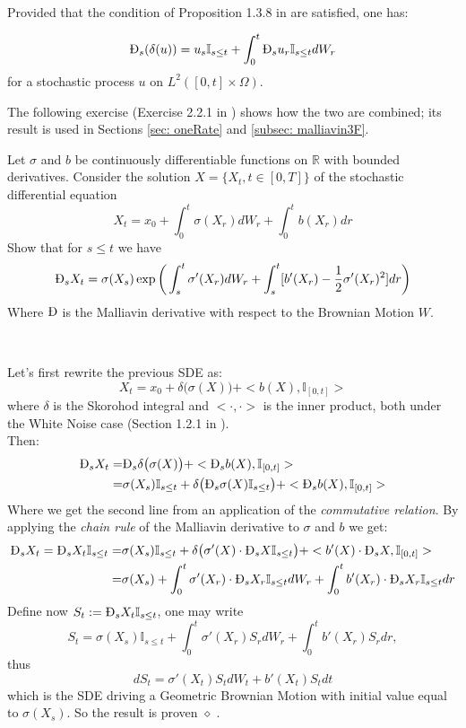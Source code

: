 \begin{prop}\ \\
Provided that the condition of Proposition 1.3.8 in \cite{nualart} are satisfied, one has:

\begin{equation}\label{eq: commumativeRelation}
\MD_s( \delta(u) )= u_s\mathbb{I}_{s\leq t} + \int_0^t\MD_s u_r \mathbb{I}_{s\leq t}dW_r
\end{equation}
for a stochastic process $u$ on $L^2([0,t] \times \Omega)$.
\end{prop}

The following exercise (Exercise 2.2.1 in \cite{nualart}) shows how the two are combined; its result is used in Sections \ref{sec: oneRate} and \ref{subsec: malliavin3F}.\\

\begin{exe}
Let $\sigma$ and $b$ be continuously differentiable functions on $\mathbb{R}$ with bounded
derivatives. Consider the solution $X = \{X_t, t \in [0, T]\}$ of the stochastic
differential equation
$$ X_t = x_0 + \int_0^t\sigma(X_r)dW_r + \int_0^tb(X_r)dr$$
Show that for $s\leq t$ we have
$$ \MD_sX_t = \sigma(X_s)\exp\bigg(\int_s^t\sigma'(X_r)dW_r  + \int_s^t[b'(X_r)-\frac{1}{2}\sigma'(X_r)^2]dr  \bigg) $$
Where $\MD$ is the Malliavin derivative with respect to the Brownian Motion $W$.
\end{exe}\
\\
\begin{sol}
Let's first rewrite the previous SDE as:
$$ X_t = x_0 + \delta\big(\sigma(X)\big) + <b(X),\mathbb{I}_{[0,t]}> $$
where $\delta$ is the Skorohod integral and $<\cdot, \cdot>$ is the inner product, both under the White Noise case (Section 1.2.1 in \cite{nualart}).\\
Then:
\begin{align*}
\MD_sX_t = & \MD_s\delta\big(\sigma(X)\big) + <\MD_sb(X),\mathbb{I}_{[0,t]}>\\
= & \sigma(X_s)\mathbb{I}_{s\leq t} + \delta\big(\MD_s\sigma(X)\mathbb{I}_{s\leq t}\big) +  <\MD_sb(X),\mathbb{I}_{[0,t]}>
\end{align*} 
Where we get the second line from an application of the \textit{commutative relation}.
By applying the \textit{chain rule} of the Malliavin derivative to $\sigma$ and $b$ we get:
\begin{align*}
\MD_sX_t =\MD_sX_t\mathbb{I}_{s\leq t}= & \sigma(X_s)\mathbb{I}_{s\leq t} + \delta\big( \sigma'(X)\cdot \MD_sX \mathbb{I}_{s\leq t}\big) + < b'(X) \cdot\MD_s X,\mathbb{I}_{[0,t]}>\\
= & \sigma(X_s) + \int_0^t \sigma'(X_r)\cdot\MD_sX_r \mathbb{I}_{s\leq t} dW_r + \int_0^t b'(X_r) \cdot\MD_s X_r\mathbb{I}_{s\leq t} dr
\end{align*} 
Define now $S_t:= \MD_sX_t\mathbb{I}_{s\leq t}$, one may write
$$ S_t = \sigma(X_s)\mathbb{I}_{s\leq t} + \int_0^t \sigma'(X_r)S_rdW_r + \int_0^t b'(X_r) S_rdr,$$
thus
$$ dS_t = \sigma'(X_t)S_tdW_t + b'(X_t) S_t dt$$
which is the SDE driving a Geometric Brownian Motion with initial value equal to $\sigma(X_s)$. So the result is proven $\diamond$ .
\end{sol}

